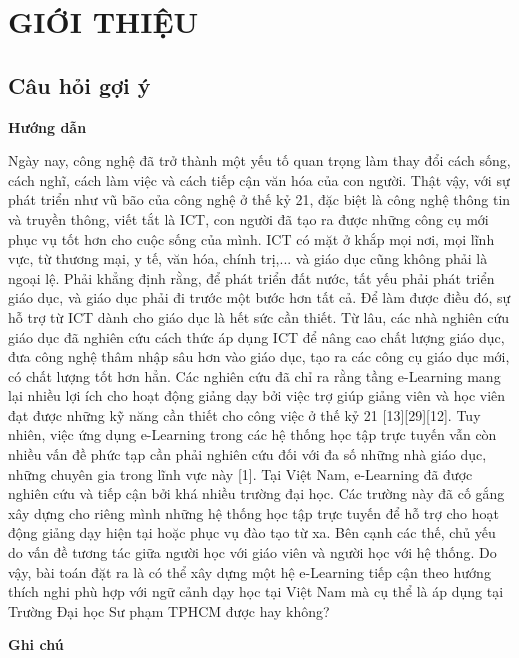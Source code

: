 \section*{GIỚI THIỆU}
\subsection*{Câu hỏi gợi ý}
\textbf{Hướng dẫn}

Ngày nay, công nghệ đã trở thành một yếu tố quan trọng làm thay đổi cách sống, cách nghĩ, cách làm việc và cách tiếp cận văn hóa của con người. Thật vậy, với sự phát triển như vũ bão của công nghệ ở thế kỷ 21, đặc biệt là công nghệ thông tin và truyền thông, viết tắt là ICT, con người đã tạo ra được những công cụ mới phục vụ tốt hơn cho cuộc sống của mình. ICT có mặt ở khắp mọi nơi, mọi lĩnh vực, từ thương mại, y tế, văn hóa, chính trị,... và giáo dục cũng không phải là ngoại lệ. Phải khẳng định rằng, để phát triển đất nước, tất yếu phải phát triển giáo dục, và giáo dục phải đi trước một bước hơn tất cả. Để làm được điều đó, sự hỗ trợ từ ICT dành cho giáo dục là hết sức cần thiết. Từ lâu, các nhà nghiên cứu giáo dục đã nghiên cứu cách thức áp dụng ICT để nâng cao chất lượng giáo dục, đưa công nghệ thâm nhập sâu hơn vào giáo dục, tạo ra các công cụ giáo dục mới, có chất lượng tốt hơn hẳn. Các nghiên cứu đã chỉ ra rằng tầng e-Learning mang lại nhiều lợi ích cho hoạt động giảng dạy bởi việc trợ giúp giảng viên và học viên đạt được những kỹ năng cần thiết cho công việc ở thế kỷ 21 [13][29][12]. Tuy nhiên, việc ứng dụng e-Learning trong các hệ thống học tập trực tuyến vẫn còn nhiều vấn đề phức tạp cần phải nghiên cứu đối với đa số những nhà giáo dục, những chuyên gia trong lĩnh vực này [1]. Tại Việt Nam, e-Learning đã được nghiên cứu và tiếp cận bởi khá nhiều trường đại học. Các trường này đã cố gắng xây dựng cho riêng mình những hệ thống học tập trực tuyến để hỗ trợ cho hoạt động giảng dạy hiện tại hoặc phục vụ đào tạo từ xa. Bên cạnh các thế, chủ yếu do vấn đề tương tác giữa người học với giáo viên và người học với hệ thống. Do vậy, bài toán đặt ra là có thể xây dựng một hệ e-Learning tiếp cận theo hướng thích nghi phù hợp với ngữ cảnh dạy học tại Việt Nam mà cụ thể là áp dụng tại Trường Đại học Sư phạm TPHCM được hay không?

\textbf{Ghi chú}